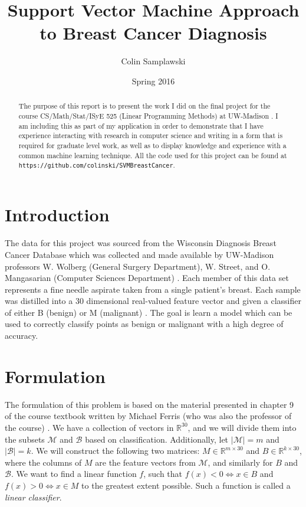 \documentclass[10pt]{article}
\title{Support Vector Machine Approach to Breast Cancer Diagnosis}
\author{Colin Samplawski}
\date{Spring 2016}
\begin{document}
\maketitle
\renewcommand{\abstractname}{Preface}
\begin{abstract}
The purpose of this report is to present the work I did on the final project for the course 
CS/Math/Stat/ISyE 525 (Linear Programming Methods) at UW-Madison \cite{525}. I am 
including this as part of my application in order to demonstrate that I have experience 
interacting with research in computer science and writing in a form that is required for 
graduate level work, as well as to display knowledge and experience with a common machine learning technique. All the code used for this project can be found at \texttt{https://github.com/colinski/SVMBreastCancer}.
\end{abstract}

\section{Introduction}
The data for this project was sourced from the Wisconsin Diagnosis Breast Cancer 
Database which was collected and made available by UW-Madison professors W. Wolberg 
(General Surgery Department), W. Street, and O. Mangasarian (Computer Sciences 
Department) \cite{dataset}. Each member of this data set represents a fine needle aspirate 
taken from a single patient's breast. Each sample was distilled into a 30 dimensional 
real-valued feature vector and given a classifier of either B (benign) or M (malignant) 
\cite{features}. The goal is learn a model which can be used to correctly classify points as benign or malignant with a high degree of accuracy.

\section{Formulation}
The formulation of this problem is based on the material presented in chapter 9 of the 
course textbook written by Michael Ferris (who was also the professor of the course) \cite{textbook}. We have a collection of vectors in $\mathbb{R}^{30}$, and we will divide them into the subsets $\mathcal{M}$ and $\mathcal{B}$ based on classification. Additionally, let $|\mathcal{M}| = m$ and $|\mathcal{B}| = k$. We will construct the following two matrices: $M \in \mathbb{R}^{m \times 30}$ and $B \in \mathbb{R}^{k \times 30}$, where the columns of $M$ are the feature vectors from $\mathcal{M}$, and similarly for $B$ and $\mathcal{B}$. We want to find a linear function $f$, such that $f(x) < 0 \Leftrightarrow x \in B$ and $f(x) > 0 \Leftrightarrow  x \in M$ to the greatest extent possible. Such a function is called a \textit{linear classifier}.
\end{document}
